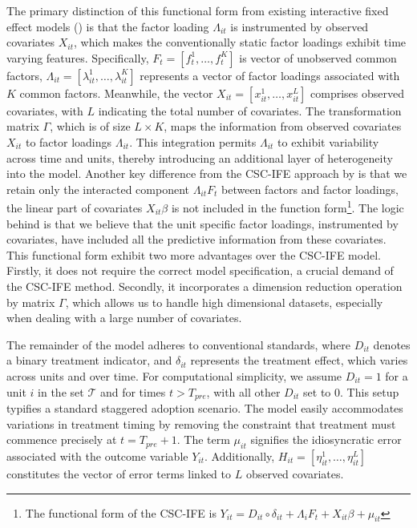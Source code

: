 \documentclass[12pt]{article}
\begin{document}
The primary distinction of this functional form from existing interactive fixed effect models (\cite{gobillon2016regional, chan2016policy}) is that the factor loading $\Lambda_{it}$ is instrumented by observed covariates $X_{it}$, which makes the conventionally static factor loadings exhibit time varying features. Specifically, $F_t = [f_t^1, \ldots, f_t^K]$ is vector of unobserved common factors, $\Lambda_{it} = [\lambda_{it}^1, \ldots, \lambda_{it}^K]$ represents a vector of factor loadings associated with $K$ common factors. Meanwhile, the vector $X_{it} = [x_{it}^1, \ldots, x_{it}^L]$ comprises observed covariates, with $L$ indicating the total number of covariates. The transformation matrix $\Gamma$, which is of size $L \times K$, maps the information from observed covariates $X_{it}$ to factor loadings $\Lambda_{it}$. This integration permits $\Lambda_{it}$ to exhibit variability across time and units, thereby introducing an additional layer of heterogeneity into the model. Another key difference from the CSC-IFE approach by \cite{xu2017generalized} is that we retain only the interacted component $\Lambda_{it} F_t$ between factors and factor loadings, the linear part of covariates $X_{it}\beta$ is not included in the function form\footnote{The functional form of the CSC-IFE is $Y_{it} = D_{it} \circ \delta_{it} + \Lambda_{i}F_{t} + X_{it}\beta + \mu_{it}$}. The logic behind is that we believe that the unit specific factor loadings, instrumented by covariates, have included all the predictive information from these covariates. This functional form exhibit two more advantages over the CSC-IFE model. Firstly, it does not require the correct model specification, a crucial demand of the CSC-IFE method. Secondly, it incorporates a dimension reduction operation by matrix $\Gamma$, which allows us to handle high dimensional datasets, especially when dealing with a large number of covariates. 

The remainder of the model adheres to conventional standards, where $D_{it}$ denotes a binary treatment indicator, and $\delta_{it}$ represents the treatment effect, which varies across units and over time. For computational simplicity, we assume $D_{it} = 1$ for a unit $i$ in the set $\mathcal{T}$ and for times $t > T_{pre}$, with all other $D_{it}$ set to $0$. This setup typifies a standard staggered adoption scenario. The model easily accommodates variations in treatment timing by removing the constraint that treatment must commence precisely at $t = T_{pre} + 1$. The term $\mu_{it}$ signifies the idiosyncratic error associated with the outcome variable $Y_{it}$. Additionally, $H_{it} = [\eta_{it}^1, \ldots, \eta_{it}^L]$ constitutes the vector of error terms linked to $L$ observed covariates.
\end{document}
